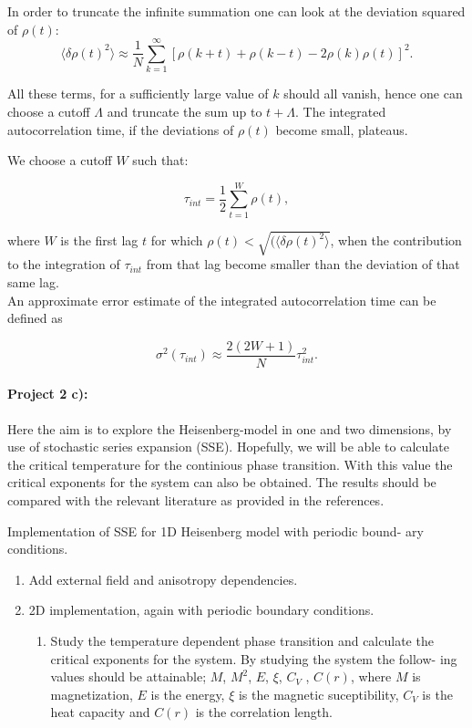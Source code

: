 \documentclass[%
oneside,                 %
final,                   %
10pt]{article}
\begin{document}
In order to truncate the infinite summation one can look at the deviation squared of $\rho(t)$:
\[
    \langle \delta \rho(t)^2\rangle \approx \frac{1}{N} \sum_{k=1}^\infty \left[ \rho(k+t) + \rho(k-t) - 2\rho(k)\rho(t)\right]^2.
\]

All these terms, for a sufficiently large value of $k$ should all
vanish, hence one can choose a cutoff $\Lambda$ and truncate the sum
up to $t+\Lambda$. The integrated autocorrelation time, if the
deviations of $\rho(t)$ become small, plateaus.

We choose a cutoff $W$ such that:

\[
    \tau_{int} = \frac{1}{2} \sum_{t=1}^W \rho(t),
    \label{autocorr_time}
\]

where $W$ is the first lag $t$ for which $\rho(t) < \sqrt{ (\langle
\delta \rho(t)^2\rangle}$, when the contribution to the integration of
$\tau_{int}$ from that lag become smaller than the deviation of that
same lag. \\ An approximate error estimate of the integrated
autocorrelation time can be defined as

\[
    \sigma^2(\tau_{int}) \approx \frac{2(2W+1)}{N}\tau_{int}^2.
\]

\paragraph{Project 2 c):}
Here the aim is to explore the Heisenberg-model in one and two
dimensions, by use of stochastic series expansion (SSE). Hopefully, we
will be able to calculate the critical temperature for the continious
phase transition. With this value the critical exponents for the
system can also be obtained.  The results should be compared with the
relevant literature as provided in the references.

Implementation of SSE for 1D Heisenberg model with periodic bound- ary conditions.
\begin{enumerate}
\item Add external field and anisotropy dependencies.

\item 2D implementation, again with periodic boundary conditions.
\begin{enumerate}

\item Study the temperature dependent phase transition and calculate the critical exponents for the system. By studying the system the follow- ing values should be attainable; $M$, $M^2$, $E$, $\xi$, $C_V$ , $C(r)$, where $M$ is magnetization, $E$ is the energy, $\xi$ is the magnetic suceptibility, $C_V$ is the heat capacity and $C(r)$ is the correlation length.
\end{enumerate}

\noindent
\end{enumerate}
\end{document}
